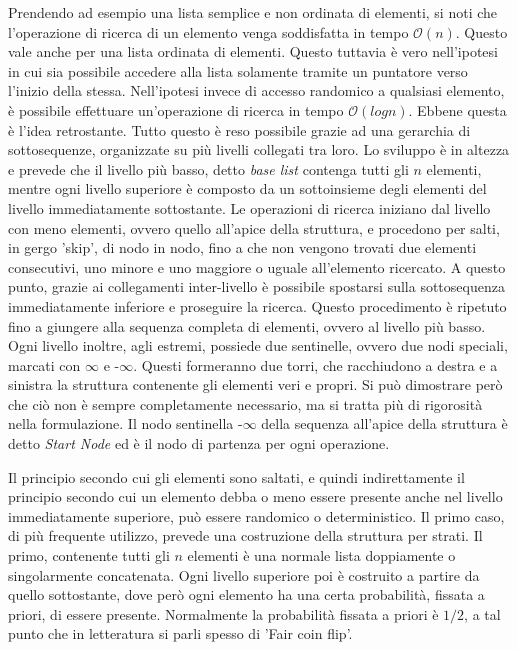 	Prendendo ad esempio una lista semplice e non ordinata di elementi, si noti che l'operazione di ricerca di un elemento venga soddisfatta in tempo $\mathcal{O}(n)$. Questo vale anche per una lista ordinata di elementi. Questo tuttavia è vero nell'ipotesi in cui sia possibile accedere alla lista solamente tramite un puntatore verso l'inizio della stessa. Nell'ipotesi invece di accesso randomico a qualsiasi elemento, è possibile effettuare un'operazione di ricerca in tempo $\mathcal{O}(log{}n)$. Ebbene questa è l'idea retrostante.
	Tutto questo è reso possibile grazie ad una gerarchia di sottosequenze, organizzate su più livelli collegati tra loro. Lo sviluppo è in altezza e prevede che il livello più basso, detto \textit{base list} contenga tutti gli $ n $ elementi, mentre ogni livello superiore è composto da un sottoinsieme degli elementi del livello immediatamente sottostante. Le operazioni di ricerca iniziano dal livello con meno elementi, ovvero quello all'apice della struttura, e procedono per salti, in gergo 'skip', di nodo in nodo, fino a che non vengono trovati due elementi consecutivi, uno minore e uno maggiore o uguale all'elemento ricercato. A questo punto, grazie ai collegamenti inter-livello è possibile spostarsi sulla sottosequenza immediatamente inferiore e proseguire la ricerca. Questo procedimento è ripetuto fino a giungere alla sequenza completa di elementi, ovvero al livello più basso.
	Ogni livello inoltre, agli estremi, possiede due sentinelle, ovvero due nodi speciali, marcati con $\infty$ e -$\infty$. Questi formeranno due torri, che racchiudono a destra e a sinistra la struttura contenente gli elementi veri e propri. Si può dimostrare però che ciò non è sempre completamente necessario, ma si tratta più di rigorosità nella formulazione.
	Il nodo sentinella -$\infty$ della sequenza all'apice della struttura è detto \textit{Start Node} ed è il nodo di partenza per ogni operazione.
	
	Il principio secondo cui gli elementi sono saltati, e quindi indirettamente il principio secondo cui un elemento debba o meno essere presente anche nel livello immediatamente superiore, può essere randomico o deterministico. Il primo caso, di più frequente utilizzo, prevede una costruzione della struttura per strati. Il primo, contenente tutti gli $ n $ elementi è una normale lista doppiamente o singolarmente concatenata. Ogni livello superiore poi è costruito a partire da quello sottostante, dove però ogni elemento ha una certa probabilità, fissata a priori, di essere presente. Normalmente la probabilità fissata a priori è $ 1/2 $, a tal punto che in letteratura si parli spesso di 'Fair coin flip'.
	
